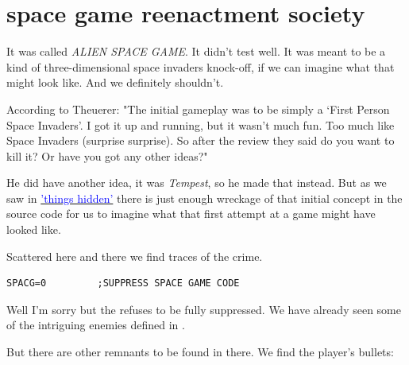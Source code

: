 \chapter{space game reenactment society}
\label{sec:recreation}
\lhead[tempest]{}
\lstset{style=6502Style}

It was called \textit{ALIEN SPACE GAME}. It didn't test well. It was meant to be a kind of
three-dimensional space invaders knock-off, if we can imagine what that might look like. And we definitely shouldn't.

According to Theuerer: "The initial gameplay was to be simply a ‘First Person Space Invaders’. I got it up and running, but it wasn’t much fun. Too much like Space Invaders (surprise surprise). So after the review they said do you want to kill it? Or have you got any other ideas?"

He did have another idea, it was \textit{Tempest}, so he made that instead. But as we saw in 
\hyperref[sec:things_hidden]{\textcolor{blue}{'things hidden'}}
there is just enough wreckage of that initial concept in the source code for us to imagine what
that first attempt at a game might have looked like.

Scattered here and there we find traces of the crime.

\begin{lstlisting}
SPACG=0			;SUPPRESS SPACE GAME CODE
\end{lstlisting}

Well I'm sorry but the  refuses to be fully suppressed. We have already seen some of the intriguing
enemies defined in . 

But there are other remnants to be found in there. We find the player's bullets:

